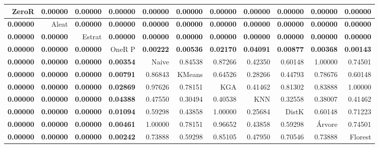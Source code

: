 \begin{table}
\centering
\label{Breast_Cancerteste_pareado_table}
\begin{tabular}{rrrrrrrrrrr}
\toprule
         ZeroR & \textbf{0.00000} & \textbf{0.00000} & \textbf{0.00000} & \textbf{0.00000} & \textbf{0.00000} & \textbf{0.00000} & \textbf{0.00000} & \textbf{0.00000} & \textbf{0.00000} & \textbf{0.00000} \\
\hline
\textbf{0.00000} &          Aleat & \textbf{0.00000} & \textbf{0.00000} & \textbf{0.00000} & \textbf{0.00000} & \textbf{0.00000} & \textbf{0.00000} & \textbf{0.00000} & \textbf{0.00000} & \textbf{0.00000} \\
\hline
\textbf{0.00000} & \textbf{0.00000} &          Estrat & \textbf{0.00000} & \textbf{0.00000} & \textbf{0.00000} & \textbf{0.00000} & \textbf{0.00000} & \textbf{0.00000} & \textbf{0.00000} & \textbf{0.00000} \\
\hline
\textbf{0.00000} & \textbf{0.00000} & \textbf{0.00000} &          OneR P & \textbf{0.00222} & \textbf{0.00536} & \textbf{0.02170} & \textbf{0.04091} & \textbf{0.00877} & \textbf{0.00368} & \textbf{0.00143} \\
\hline
\textbf{0.00000} & \textbf{0.00000} & \textbf{0.00000} & \textbf{0.00354} &          Naive &          0.84538 &          0.87266 &          0.42350 &          0.60148 &          1.00000 &          0.74501 \\
\hline
\textbf{0.00000} & \textbf{0.00000} & \textbf{0.00000} & \textbf{0.00791} &          0.86843 &          KMeans &          0.64526 &          0.28266 &          0.44793 &          0.78676 &          0.60148 \\
\hline
\textbf{0.00000} & \textbf{0.00000} & \textbf{0.00000} & \textbf{0.02869} &          0.97626 &          0.78151 &             KGA &          0.41462 &          0.81302 &          0.83888 &          1.00000 \\
\hline
\textbf{0.00000} & \textbf{0.00000} & \textbf{0.00000} & \textbf{0.04388} &          0.47550 &          0.30494 &          0.40538 &          KNN &          0.32558 &          0.38007 &          0.41462 \\
\hline
\textbf{0.00000} & \textbf{0.00000} & \textbf{0.00000} & \textbf{0.01094} &          0.59298 &          0.43858 &          1.00000 &          0.25684 &          DistK &          0.60148 &          0.71223 \\
\hline
\textbf{0.00000} & \textbf{0.00000} & \textbf{0.00000} & \textbf{0.00461} &          1.00000 &          0.78151 &          0.96652 &          0.43858 &          0.59298 &          Árvore &          0.74501 \\
\hline
\textbf{0.00000} & \textbf{0.00000} & \textbf{0.00000} & \textbf{0.00242} &          0.73888 &          0.59298 &          0.85105 &          0.47950 &          0.70546 &          0.73888 &          Florest \\
\bottomrule
\end{tabular}
\end{table}
